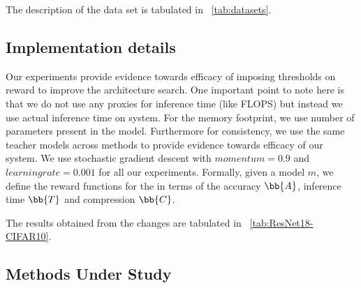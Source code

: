 \documentclass[../main]{subfiles}
\begin{document}
            
        The description of the data set is tabulated in \tablename~\ref{tab:datasets}.
    
        
    \subsection{Implementation details}
    Our experiments provide evidence towards efficacy of imposing thresholds on reward to improve the architecture search.
    One important point to note here is that we do not use any proxies for inference time (like FLOPS) but instead we use actual inference time on system.
    For the memory footprint, we use number of parameters present in the model.
    Furthermore for consistency, we use the same teacher models across methods to provide evidence towards efficacy of our system.
    We use stochastic gradient descent with $momentum = 0.9 $ and $learning rate = 0.001$ for all our experiments.
    Formally, given a model $m$, we define the reward functions for the in terms of the accuracy $\bb{A}$, inference time $\bb{T}$ and compression $\bb{C}$.

    The results obtained from the changes are tabulated in \tablename~\ref{tab:ResNet18-CIFAR10}.

    

    

    

    \subsection{Methods Under Study}
        \label{sec:baselines}
        
\end{document}
